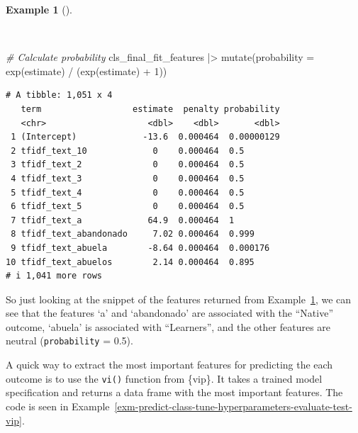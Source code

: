 \documentclass[
  letterpaper,
  krantz1]{latex/krantz-mod}
\newenvironment{Shaded}{\begin{snugshade}}{\end{snugshade}}
\newcommand{\AttributeTok}[1]{\textcolor[rgb]{0.00,0.00,0.00}{#1}}
\newcommand{\CommentTok}[1]{\textcolor[rgb]{0.00,0.00,0.00}{\textit{#1}}}
\newcommand{\DecValTok}[1]{\textcolor[rgb]{0.00,0.00,0.00}{#1}}
\newcommand{\FunctionTok}[1]{\textcolor[rgb]{0.00,0.00,0.00}{#1}}
\newcommand{\NormalTok}[1]{\textcolor[rgb]{0.00,0.00,0.00}{#1}}
\newcommand{\SpecialCharTok}[1]{\textcolor[rgb]{0.00,0.00,0.00}{#1}}
\theoremstyle{definition}
\newtheorem{example}{Example}[chapter]
\theoremstyle{definition}
\theoremstyle{remark}
\begin{document}
\begin{example}[]\protect\hypertarget{exm-predict-class-tune-hyperparameters-evaluate-test-estimates-probability}{}\label{exm-predict-class-tune-hyperparameters-evaluate-test-estimates-probability}

~

\begin{Shaded}
\begin{Highlighting}[numbers=left,,]
\CommentTok{\# Calculate probability}
\NormalTok{cls\_final\_fit\_features }\SpecialCharTok{|\textgreater{}}
  \FunctionTok{mutate}\NormalTok{(}\AttributeTok{probability =} \FunctionTok{exp}\NormalTok{(estimate) }\SpecialCharTok{/}\NormalTok{ (}\FunctionTok{exp}\NormalTok{(estimate) }\SpecialCharTok{+} \DecValTok{1}\NormalTok{))}
\end{Highlighting}
\end{Shaded}

\begin{verbatim}
# A tibble: 1,051 x 4
   term                  estimate  penalty probability
   <chr>                    <dbl>    <dbl>       <dbl>
 1 (Intercept)             -13.6  0.000464  0.00000129
 2 tfidf_text_10             0    0.000464  0.5       
 3 tfidf_text_2              0    0.000464  0.5       
 4 tfidf_text_3              0    0.000464  0.5       
 5 tfidf_text_4              0    0.000464  0.5       
 6 tfidf_text_5              0    0.000464  0.5       
 7 tfidf_text_a             64.9  0.000464  1         
 8 tfidf_text_abandonado     7.02 0.000464  0.999     
 9 tfidf_text_abuela        -8.64 0.000464  0.000176  
10 tfidf_text_abuelos        2.14 0.000464  0.895     
# i 1,041 more rows
\end{verbatim}

\end{example}

So just looking at the snippet of the features returned from
Example~\ref{exm-predict-class-tune-hyperparameters-evaluate-test-estimates-probability},
we can see that the features `a' and `abandonado' are associated with
the ``Native'' outcome, `abuela' is associated with ``Learners'', and
the other features are neutral (\texttt{probability} = 0.5).

A quick way to extract the most important features for predicting the
each outcome is to use the \texttt{vi()} function from \{vip\}. It takes
a trained model specification and returns a data frame with the most
important features. The code is seen in
Example~\ref{exm-predict-class-tune-hyperparameters-evaluate-test-vip}.
\end{document}
